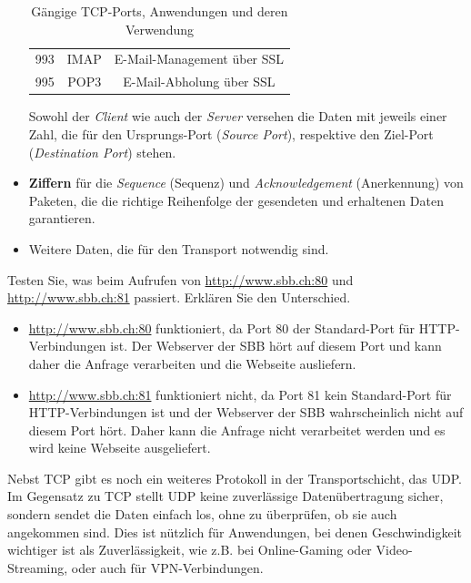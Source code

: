 \begin{itemize}
\begin{table}[H]
\begin{tabular}{c||c|c}
			      993           & \acrfull{IMAP}     & E-Mail-Management über \acrshort{SSL} \\
			      995           & \acrfull{POP3}     & E-Mail-Abholung über \acrshort{SSL}   \\
			      \bottomrule
		      \end{tabular}
		      \caption{Gängige \gls{TCP}-Ports, Anwendungen und deren Verwendung}
		      \label{tab:tcpPorts}
	      \end{table}
	      Sowohl der \textit{Client} wie auch der \textit{Server} versehen die Daten mit jeweils einer Zahl, die für den Ursprungs-Port (\textit{Source Port}), respektive den Ziel-Port (\textit{Destination Port}) stehen.
	\item \textbf{Ziffern} für die \textit{Sequence} (Sequenz) und \textit{Acknowledgement} (Anerkennung) von Paketen, die die richtige Reihenfolge der gesendeten und erhaltenen Daten garantieren.
	\item Weitere Daten, die für den Transport notwendig sind.
\end{itemize}

\begin{myexercise}
	Testen Sie, was beim Aufrufen von \url{http://www.sbb.ch:80} und \url{http://www.sbb.ch:81} passiert. Erklären Sie den Unterschied.
	\begin{myanswer}
		\begin{itemize}
			\item \url{http://www.sbb.ch:80} funktioniert, da Port 80 der Standard-Port für HTTP-Verbindungen ist. Der Webserver der SBB hört auf diesem Port und kann daher die Anfrage verarbeiten und die Webseite ausliefern.
			\item \url{http://www.sbb.ch:81} funktioniert nicht, da Port 81 kein Standard-Port für HTTP-Verbindungen ist und der Webserver der SBB wahrscheinlich nicht auf diesem Port hört. Daher kann die Anfrage nicht verarbeitet werden und es wird keine Webseite ausgeliefert.
		\end{itemize}
	\end{myanswer}
\end{myexercise}

Nebst \gls{TCP} gibt es noch ein weiteres Protokoll in der Transportschicht, das \gls{UDP}. Im Gegensatz zu \gls{TCP} stellt \gls{UDP} keine zuverlässige Datenübertragung sicher, sondern sendet die Daten einfach los, ohne zu überprüfen, ob sie auch angekommen sind. Dies ist nützlich für Anwendungen, bei denen Geschwindigkeit wichtiger ist als Zuverlässigkeit, wie z.B. bei Online-Gaming oder Video-Streaming, oder auch für \gls{VPN}-Verbindungen.


